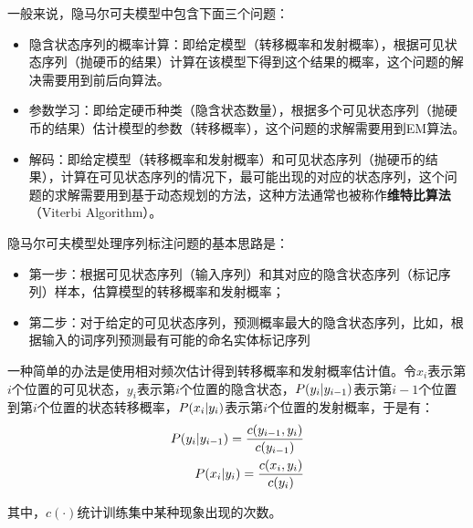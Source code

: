 \parinterval 一般来说，隐马尔可夫模型中包含下面三个问题：

\begin{itemize}
\vspace{0.5em}
\item 隐含状态序列的概率计算：即给定模型（转移概率和发射概率），根据可见状态序列（抛硬币的结果）计算在该模型下得到这个结果的概率，这个问题的解决需要用到前后向算法。
\vspace{0.5em}
\item 参数学习：即给定硬币种类（隐含状态数量），根据多个可见状态序列（抛硬币的结果）估计模型的参数（转移概率），这个问题的求解需要用到EM算法。
\item 解码：即给定模型（转移概率和发射概率）和可见状态序列（抛硬币的结果），计算在可见状态序列的情况下，最可能出现的对应的状态序列，这个问题的求解需要用到基于动态规划的方法，这种方法通常也被称作{\small\sffamily\bfseries{维特比算法}}（Viterbi Algorithm）。
\vspace{0.5em}
\end{itemize}
\parinterval 隐马尔可夫模型处理序列标注问题的基本思路是：

\begin{itemize}
\vspace{0.5em}
\item 第一步：根据可见状态序列（输入序列）和其对应的隐含状态序列（标记序列）样本，估算模型的转移概率和发射概率；
\vspace{0.5em}
\item 第二步：对于给定的可见状态序列，预测概率最大的隐含状态序列，比如，根据输入的词序列预测最有可能的命名实体标记序列
\vspace{0.5em}
\end{itemize}

\parinterval 一种简单的办法是使用相对频次估计得到转移概率和发射概率估计值。令$x_i$表示第$i$个位置的可见状态，$y_i$表示第$i$个位置的隐含状态，${P}(y_i|y_{i-1})$表示第$i-1$个位置到第$i$个位置的状态转移概率，${P}(x_i|y_{i}) $表示第$i$个位置的发射概率，于是有：
\begin{eqnarray}
{P}(y_i|y_{i-1}) = \frac{{c}(y_{i-1},y_i)}{{c}(y_{i-1})}
\label{eq:3.3-1}\\
{P}(x_i|y_{i}) = \frac{{c}(x_i,y_i)}{{c}(y_i)}
\label{eq:3.3-2}
\end{eqnarray}

\noindent 其中，${c}(\cdot)$统计训练集中某种现象出现的次数。

